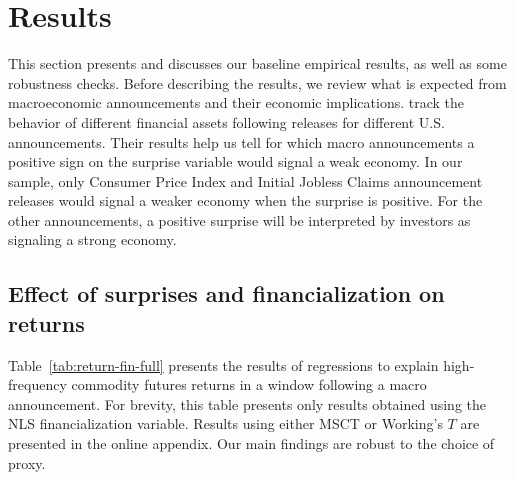 \section{Results} \label{sec:result}
This section presents and discusses our baseline empirical results, as well as some robustness checks. Before describing the results, we review what is expected from macroeconomic announcements and their economic implications.
   \citet*{boehm2020us} track the behavior of different financial assets following releases for different U.S. announcements. Their results help us tell for which  macro announcements a positive sign on the surprise variable would signal a weak economy. In our sample, only Consumer Price Index \citep*{bryan1993consumer,clark1997us} and Initial Jobless Claims \citep*{fleming1997moves,fleming1999price,getz1990barometer} announcement releases would signal a weaker economy when the surprise is positive.  For the other announcements, a positive surprise will be interpreted by investors as signaling a strong economy. %

 
 
 


\subsection{Effect of surprises and financialization on returns}
Table~\ref{tab:return-fin-full} presents the results of regressions to explain high-frequency commodity futures returns in a window following a macro announcement. For brevity, this table presents only results obtained using the NLS financialization variable. Results using either MSCT or Working's $T$ are presented in the online appendix. Our main findings are robust to the choice of proxy. 

